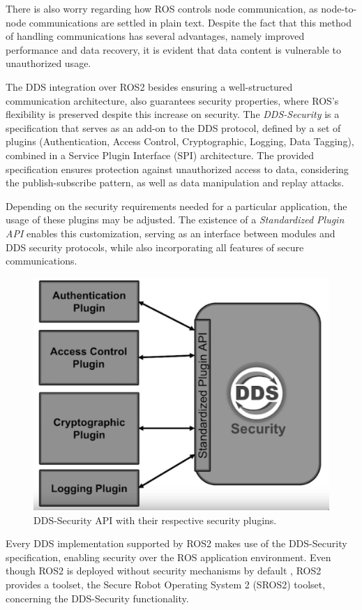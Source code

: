 There is also worry regarding how ROS controls node communication, as node-to-node communications are settled in plain text. Despite the fact that this method of handling communications has several advantages, namely improved performance and data recovery, it is evident that data content is vulnerable to unauthorized usage.

The DDS integration over ROS2 besides ensuring a well-structured communication architecture, also guarantees security properties, where ROS's flexibility is preserved despite this increase on security. The \textit{DDS-Security} \cite{dds-s} is a specification that serves as an add-on to the DDS protocol, defined by a set of plugins (Authentication, Access Control, Cryptographic, Logging, Data Tagging), combined in a Service Plugin Interface (SPI) architecture. The provided specification ensures protection against unauthorized access to data, considering the publish-subscribe pattern, as well as data manipulation and replay attacks. \cite{8442103, ros-dds-integration}

Depending on the security requirements needed for a particular application, the usage of these plugins  may be adjusted. The existence of a \textit{Standardized Plugin API} enables this customization, serving as an interface between modules and DDS security protocols, while also incorporating all features of secure communications. 

\begin{figure}[H]
    \centering
    \includegraphics[width=0.5\linewidth]{images/dds-security.png}
    \caption{DDS-Security API with their respective security plugins.}
    \label{fig:dds-security}
\end{figure}

Every DDS implementation supported by ROS2 makes use of the DDS-Security specification, enabling security over the ROS application environment. Even though ROS2 is deployed without security mechanisms by default \cite{ros-dds-integration}, ROS2 provides a toolset, the Secure Robot Operating System 2 (SROS2) toolset, concerning the DDS-Security functionality.

